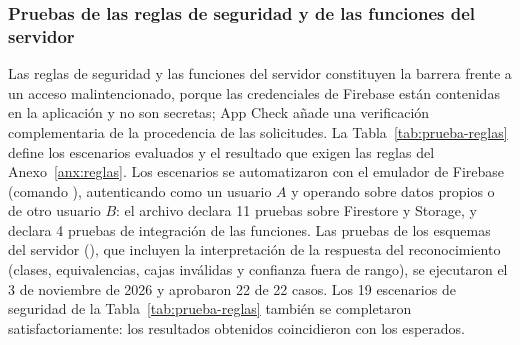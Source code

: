 \subsubsection{Pruebas de las reglas de seguridad y de las funciones del servidor}
\label{sec:pruebas-seguridad}

Las reglas de seguridad y las funciones del servidor constituyen la barrera
frente a un acceso malintencionado, porque las credenciales de Firebase están
contenidas en la aplicación y no son secretas; App Check añade una verificación
complementaria de la procedencia de las solicitudes. La Tabla~\ref{tab:prueba-reglas} define los escenarios evaluados
y el resultado que exigen las reglas del Anexo~\ref{anx:reglas}. Los
escenarios se automatizaron con el emulador de Firebase (comando
), autenticando como un usuario $A$ y operando
sobre datos propios o de otro usuario $B$: el archivo
 declara 11 pruebas sobre Firestore y
Storage, y  declara 4 pruebas
de integración de las funciones. Las pruebas de los esquemas del servidor
(), que incluyen la interpretación de la
respuesta del reconocimiento (clases, equivalencias, cajas inválidas y confianza
fuera de rango), se ejecutaron el 3 de noviembre de 2026 y aprobaron 22 de 22
casos. Los 19 escenarios de seguridad de la
Tabla~\ref{tab:prueba-reglas} también se completaron satisfactoriamente: los
resultados obtenidos coincidieron con los esperados.

